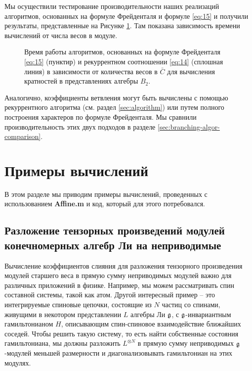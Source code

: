 Мы осуществили тестирование производительности наших реализаций алгоритмов, основанных на формуле Фрейденталя и формуле \eqref{eq:15} и получили результаты, представленные на Рисунке  \ref{fig:freudenthal-racah-times}. Там показана зависимость времени вычислений от числа весов в модуле.

\begin{figure}[h]
  \noindent{}
  \caption{Время работы алгоритмов, основанных на формуле Фрейденталя \eqref{eq:15} (пунктир) и рекуррентном соотношении \eqref{eq:14} (сплошная линия) в зависимости от количества весов в  $\bar C$ для вычисления кратностей в представлениях алгебры $B_{2}$.}
\label{fig:freudenthal-racah-times}

\end{figure}

Аналогично, коэффициенты ветвления могут быть вычислены с помощью рекуррентного алгоритма (см. раздел \ref{sec:algorithm}) или путем полного построения характеров по формуле Фрейденталя. Мы сравнили  производительность этих двух подходов в разделе \ref{sec:branching-algor-comparison}.

\section{Примеры вычислений}
\label{sec:examples-six}
В этом разделе мы приводим примеры вычислений, проведенных с использованием {\bf Affine.m} и код, который для этого потребовался.

\subsection{Разложение тензорных произведений модулей конечномерных алгебр Ли на неприводимые}
\label{sec:tens-prod-decomp}

Вычисление коэффициентов слияния для разложения тензорного произведения модулей старшего веса в прямую сумму неприводимых модулей важно для различных приложений в физике. Например, мы можем рассматривать спин составной системы, такой как атом. Другой интересный пример -- это интегрируемые спиновые цепочки, состоящие из  $N$ частиц со спинами, живущими в некотором представлении  $L$ алгебры Ли $\mathfrak{g}$, с  $\mathfrak{g}$-инвариантным гамильтонианом $H$, описывающим спин-спиновое взаимодействие ближайших соседей. Чтобы решить такую систему, то есть найти собственные состояния гамильтониана, мы должны разложить  $L^{\otimes N}$ в прямую сумму неприводимых $\mathfrak{g}$-модулей меньшей размерности и диагонализовывать гамильтониан на этих модулях.


